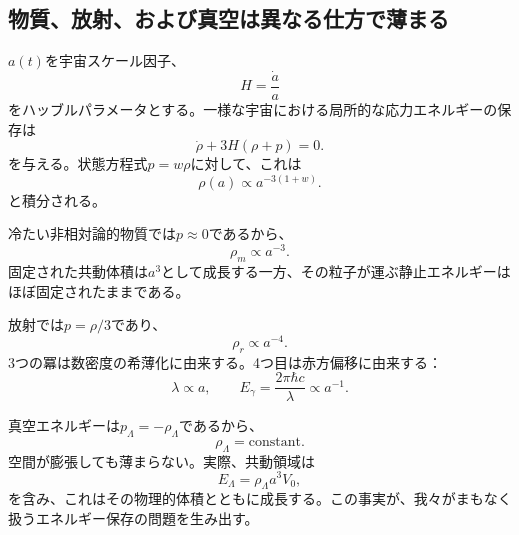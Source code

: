 \vspace{-2pt}
\subsection{物質、放射、および真空は異なる仕方で薄まる}

\(a(t)\)を宇宙スケール因子、
\begin{equation}
H=\frac{\dot a}{a}
\end{equation}
をハッブルパラメータとする。一様な宇宙における局所的な応力エネルギーの保存は
\begin{equation}
\dot\rho+3H(\rho+p)=0.
\end{equation}
を与える。状態方程式\(p=w\rho\)に対して、これは
\begin{equation}
\rho(a)\propto a^{-3(1+w)}.
\end{equation}
と積分される。

冷たい非相対論的物質では\(p\approx0\)であるから、
\begin{equation}
\rho_m\propto a^{-3}.
\end{equation}
固定された共動体積は\(a^3\)として成長する一方、その粒子が運ぶ静止エネルギーはほぼ固定されたままである。

放射では\(p=\rho/3\)であり、
\begin{equation}
\rho_r\propto a^{-4}.
\end{equation}
3つの冪は数密度の希薄化に由来する。4つ目は赤方偏移に由来する：
\begin{equation}
\lambda\propto a,
\qquad
E_\gamma=\frac{2\pi\hbar c}{\lambda}\propto a^{-1}.
\end{equation}

\begin{classroomqa}
\end{classroomqa}

真空エネルギーは\(p_\Lambda=-\rho_\Lambda\)であるから、
\begin{equation}
\rho_\Lambda=\text{constant}.
\end{equation}
空間が膨張しても薄まらない。実際、共動領域は
\begin{equation}
E_\Lambda=\rho_\Lambda a^3V_0,
\end{equation}
を含み、これはその物理的体積とともに成長する。この事実が、我々がまもなく扱うエネルギー保存の問題を生み出す。

